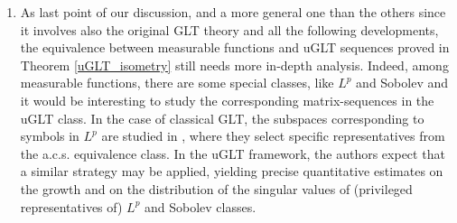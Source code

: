 \documentclass{amsart}
\begin{document}
\begin{enumerate}
    \item[(f)] As last point of our discussion, and a more general one than the others since it involves also the original GLT theory and all the following developments, the equivalence between measurable functions and uGLT sequences proved in Theorem \ref{uGLT_isometry} still needs more in-depth analysis. Indeed, among measurable functions, there are some special classes, like $L^p$ and Sobolev and it would be interesting to study the corresponding matrix-sequences in the uGLT class. In the case of classical GLT, the subspaces corresponding to symbols in $L^p$ are studied in \cite{KRS22}, where they select specific representatives from the a.c.s. equivalence class. In the uGLT framework, the authors expect that a similar strategy may be applied, yielding precise quantitative estimates on the growth and on the distribution of the singular values of (privileged representatives of) $L^p$ and Sobolev classes.

\end{enumerate}
\end{document}
